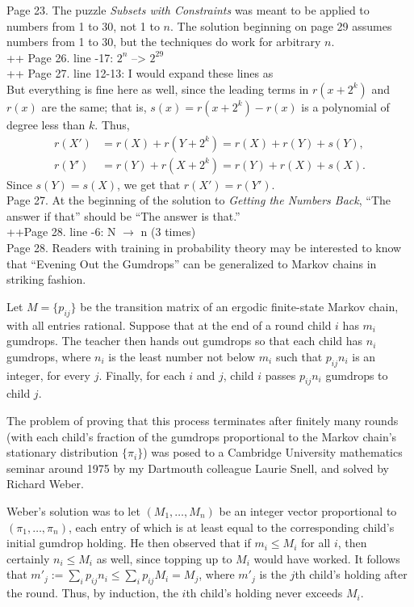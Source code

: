 \documentclass[11pt]{article}
\begin{document}
Page 23.  The puzzle {\em Subsets with Constraints}
was meant to be applied to numbers from 1 to 30,
not 1 to $n$.  The solution beginning on page 29 assumes
numbers from 1 to 30, but the techniques do work for arbitrary $n$.\\

++ Page 26. line -17: $2^n$ --> $2^{29}$\\

++ Page 27. line 12-13: I would expand these lines as \\

But everything is fine here as well, since the leading terms in \( r(x+2^k) \) and \( r(x) \) are the same;
that is, \( s(x) = r(x+2^k) - r(x) \) is a polynomial of degree less than \( k \).
Thus,
\begin{align*}
r(X') &= r(X) + r(Y + 2^k) = r(X) + r(Y) + s(Y), \\
r(Y') &= r(Y) + r(X + 2^k) = r(Y) + r(X) + s(X).
\end{align*}
Since \( s(Y) = s(X) \), we get that \( r(X') = r(Y') \).
\\

Page 27. At the beginning of the solution to {\em Getting the Numbers Back},
``The answer if that'' should be ``The answer is that.''\\

++Page 28. line -6: N $\to$ n (3 times) \\

Page 28.  Readers with training in probability theory may be interested to know that
``Evening Out the Gumdrops'' can be generalized to Markov chains in striking fashion.

Let $M = \{p_{ij}\}$ be the transition matrix of an ergodic finite-state Markov chain,
with all entries rational.  Suppose that at the end of a round child $i$ has $m_i$ gumdrops.
The teacher then hands out gumdrops so that each child has $n_i$ gumdrops, where
$n_i$ is the least number not below $m_i$ such that $p_{ij}n_i$ is an integer, for every $j$.  Finally,
for each $i$ and $j$, child $i$ passes $p_{ij}n_i$ gumdrops to child $j$.

The problem of proving that this process terminates after finitely many rounds
(with each child's fraction of the gumdrops proportional to the Markov chain's
stationary distribution $\{\pi_i\}$) was posed to a Cambridge University mathematics seminar
around 1975 by my Dartmouth colleague Laurie Snell, and solved by Richard Weber.

Weber's solution was to let $(M_1,\dots,M_n)$ be an integer vector proportional
to $(\pi_1,\dots,\pi_n)$, each entry of which is at least equal to the corresponding child's
initial gumdrop holding.  He then observed that if $m_i \le M_i$ for all $i$, then 
certainly $n_i \le M_i$ as well, since topping up to $M_i$ would have worked.
It follows that $m'_j := \sum_i p_{ij} n_i \le \sum_i p_{ij} M_i = M_j$, where
$m'_j$ is the $j$th child's holding after the round.  Thus, by induction, the $i$th
child's holding never exceeds $M_i$.
\end{document}
